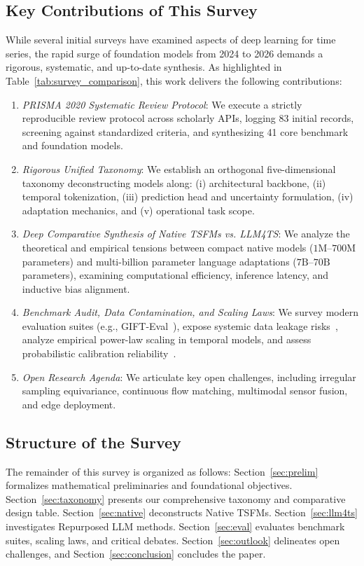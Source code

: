 \subsection{Key Contributions of This Survey}
While several initial surveys have examined aspects of deep learning for time series, the rapid surge of foundation models from 2024 to 2026 demands a rigorous, systematic, and up-to-date synthesis. As highlighted in Table~\ref{tab:survey_comparison}, this work delivers the following contributions:
\begin{enumerate}[leftmargin=*]
    \item \emph{PRISMA 2020 Systematic Review Protocol}: We execute a strictly reproducible review protocol across scholarly APIs, logging 83 initial records, screening against standardized criteria, and synthesizing 41 core benchmark and foundation models.
    \item \emph{Rigorous Unified Taxonomy}: We establish an orthogonal five-dimensional taxonomy deconstructing models along: (i) architectural backbone, (ii) temporal tokenization, (iii) prediction head and uncertainty formulation, (iv) adaptation mechanics, and (v) operational task scope.
    \item \emph{Deep Comparative Synthesis of Native TSFMs vs. LLM4TS}: We analyze the theoretical and empirical tensions between compact native models ($1\text{M}$--$700\text{M}$ parameters) and multi-billion parameter language adaptations ($7\text{B}$--$70\text{B}$ parameters), examining computational efficiency, inference latency, and inductive bias alignment.
    \item \emph{Benchmark Audit, Data Contamination, and Scaling Laws}: We survey modern evaluation suites (e.g., GIFT-Eval~\cite{salesforce2024gifteval}), expose systemic data leakage risks~\cite{gong2025rethinkingeval}, analyze empirical power-law scaling in temporal models, and assess probabilistic calibration reliability~\cite{li2026evaluatingreliability}.
    \item \emph{Open Research Agenda}: We articulate key open challenges, including irregular sampling equivariance, continuous flow matching, multimodal sensor fusion, and edge deployment.
\end{enumerate}

\subsection{Structure of the Survey}
The remainder of this survey is organized as follows: Section~\ref{sec:prelim} formalizes mathematical preliminaries and foundational objectives. Section~\ref{sec:taxonomy} presents our comprehensive taxonomy and comparative design table. Section~\ref{sec:native} deconstructs Native TSFMs. Section~\ref{sec:llm4ts} investigates Repurposed LLM methods. Section~\ref{sec:eval} evaluates benchmark suites, scaling laws, and critical debates. Section~\ref{sec:outlook} delineates open challenges, and Section~\ref{sec:conclusion} concludes the paper.
